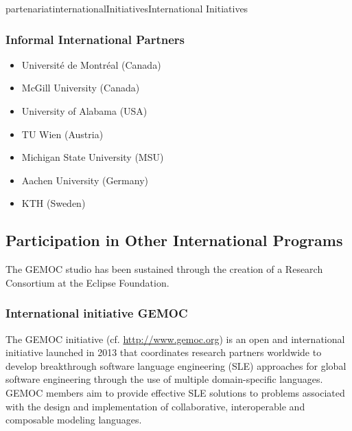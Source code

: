 \documentclass{ra2018}
\begin{document}
\begin{module}{partenariat}{internationalInitiatives}{International Initiatives}
%




        \subsubsection{Informal International Partners}
        

\begin{itemize}
\item Université de Montréal (Canada)
\item McGill University (Canada)
\item University of Alabama (USA)
\item TU Wien (Austria)
\item Michigan State University (MSU)
\item Aachen University (Germany)
\item KTH (Sweden)
\end{itemize}

\subsection{Participation in Other International Programs}

The GEMOC studio has been sustained through the creation of a Research Consortium at the Eclipse Foundation.

\subsubsection{International initiative GEMOC}
The GEMOC initiative (cf. \url{http://www.gemoc.org}) is an open and international initiative launched in 2013 that coordinates research partners worldwide to develop breakthrough software language engineering (SLE) approaches for global software engineering through the use of multiple domain-specific languages. GEMOC members aim to provide effective SLE solutions to problems associated with the design and implementation of collaborative, interoperable and composable modeling languages.


\end{module}
\end{document}
